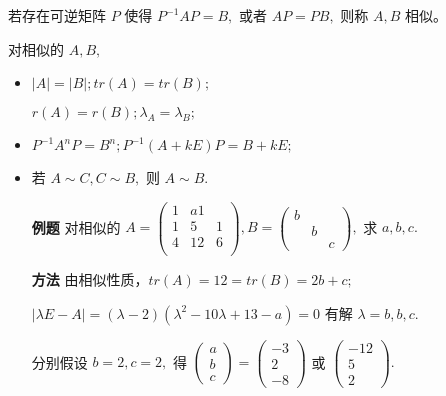 
若存在可逆矩阵 $ P $ 使得 $ P^{-1}AP = B, $ 或者 $ AP = PB, $ 则称 $ A,B $ 相似。


对相似的 $ A,B, $ 

\begin{itemize}
    \item $ |A| = |B|; tr(A) = tr(B); $ 
    
    $ r(A) = r(B); \lambda_A = \lambda_B; $ 
    \item $ P^{-1}A^nP = B^{n}; P^{-1}(A+kE)P = B+kE; $ 
    \item 若 $ A\sim C, C\sim B, $ 则 $ A\sim B. $ 
\end{itemize}

\begin{itemize}
    \item[\textbf{例题}] 对相似的 $ A = \begin{pmatrix}
        1&a1\\1&5&1\\4&12&6\\
    \end{pmatrix},B = \begin{pmatrix}
        b&&\\&b&\\&&c
    \end{pmatrix}, $ 求 $ a,b,c. $ 
    \item[\textbf{方法}] 由相似性质，$ tr(A) = 12 = tr(B) = 2b + c; $
    
    $ |\lambda E-A| = (\lambda-2)(\lambda^2 - 10\lambda +13 - a)=0 $ 
    有解 $ \lambda = b,b,c. $ 
    
    分别假设 $ b = 2,c = 2, $ 得
    $ \begin{pmatrix}
        a\\b\\c
    \end{pmatrix} = \begin{pmatrix}
        -3 \\ 2 \\ -8
    \end{pmatrix} $ 或
    $ \begin{pmatrix}
        -12\\5\\2
    \end{pmatrix}. $ 
\end{itemize}

